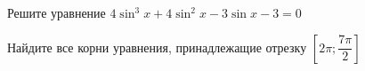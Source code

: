 \begin{ex}
	\begin{condition}
		\begin{enumcols}[label=\asbuk*)]
			\item Решите уравнение \( 4\sin^3 x +4\sin^2 x - 3\sin x -3 = 0 \)
			\item Найдите все корни уравнения, принадлежащие отрезку \( \left[2\pi;\dfrac{7\pi}{2}\right] \)
		\end{enumcols}
	\end{condition}
\end{ex}
